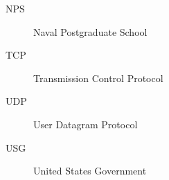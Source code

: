 
\begin{description}
\item[NPS] Naval Postgraduate School
\item[TCP] Transmission Control Protocol
\item[UDP] User Datagram Protocol
\item[USG] United States Government
\end{description}







